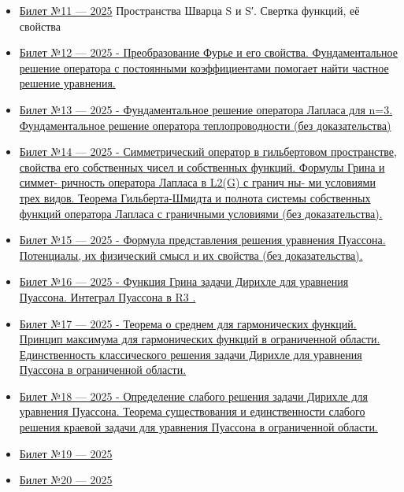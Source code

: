 \documentclass[12pt, a4paper]{article}
\begin{document}
\begin{itemize}
  \item \hyperref[sec:ticket11]{Билет №11 — 2025}
  Пространства Шварца S и S′. Свертка функций, её
свойства
  \item \hyperref[sec:ticket12]{Билет №12 — 2025 -   Преобразование Фурье и его свойства. Фундаментальное решение оператора с постоянными коэффициентами помогает найти частное решение
уравнения.}

  \item \hyperref[sec:ticket13]{Билет №13 — 2025 -   Фундаментальное решение оператора Лапласа для n=3. Фундаментальное решение оператора теплопроводности (без доказательства) }

  \item \hyperref[sec:ticket14]{Билет №14 — 2025 -   Симметрический оператор в гильбертовом пространстве,
свойства его собственных чисел и собственных функций. Формулы Грина и симмет-
ричность оператора Лапласа в L2(G) с гранич ны- ми условиями трех видов. Теорема
Гильберта-Шмидта и полнота системы собственных функций оператора Лапласа с
граничными условиями (без доказательства).}

  \item \hyperref[sec:ticket15]{Билет №15 — 2025 -   Формула представления решения уравнения Пуассона. Потенциалы, их физический смысл и их свойства (без доказательства).}

  \item \hyperref[sec:ticket16]{Билет №16 — 2025 -   Функция Грина задачи Дирихле для уравнения Пуассона.
Интеграл Пуассона в R3 .}

  \item \hyperref[sec:ticket17]{Билет №17 — 2025 -   Теорема о среднем для гармонических функций. Принцип
максимума для гармонических функций в ограниченной области. Единственность
классического решения задачи Дирихле для уравнения Пуассона в ограниченной
области.}

  \item \hyperref[sec:ticket18]{Билет №18 — 2025 - Определение слабого решения задачи Дирихле для уравнения Пуассона. Теорема существования и единственности слабого решения краевой
задачи для уравнения Пуассона в ограниченной области. }
  
  \item \hyperref[sec:ticket19]{Билет №19 — 2025}
  \item \hyperref[sec:ticket20]{Билет №20 — 2025}
\end{itemize}

\newpage
\end{document}
